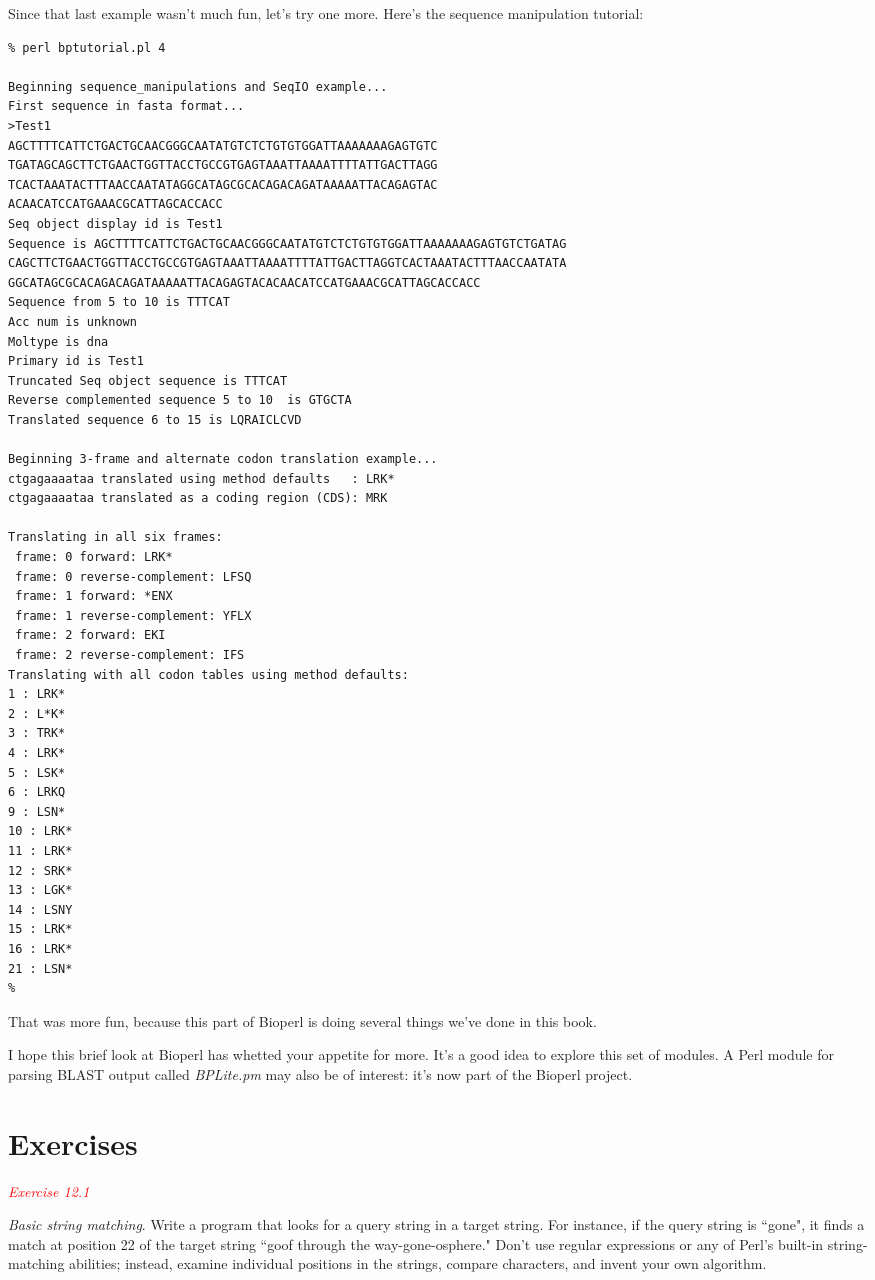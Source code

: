 Since that last example wasn't much fun, let's try one more. Here's the sequence manipulation tutorial: 

\begin{lstlisting}
% perl bptutorial.pl 4

Beginning sequence_manipulations and SeqIO example... 
First sequence in fasta format... 
>Test1
AGCTTTTCATTCTGACTGCAACGGGCAATATGTCTCTGTGTGGATTAAAAAAAGAGTGTC
TGATAGCAGCTTCTGAACTGGTTACCTGCCGTGAGTAAATTAAAATTTTATTGACTTAGG
TCACTAAATACTTTAACCAATATAGGCATAGCGCACAGACAGATAAAAATTACAGAGTAC
ACAACATCCATGAAACGCATTAGCACCACC
Seq object display id is Test1
Sequence is AGCTTTTCATTCTGACTGCAACGGGCAATATGTCTCTGTGTGGATTAAAAAAAGAGTGTCTGATAG
CAGCTTCTGAACTGGTTACCTGCCGTGAGTAAATTAAAATTTTATTGACTTAGGTCACTAAATACTTTAACCAATATA
GGCATAGCGCACAGACAGATAAAAATTACAGAGTACACAACATCCATGAAACGCATTAGCACCACC 
Sequence from 5 to 10 is TTTCAT 
Acc num is unknown 
Moltype is dna 
Primary id is Test1 
Truncated Seq object sequence is TTTCAT 
Reverse complemented sequence 5 to 10  is GTGCTA  
Translated sequence 6 to 15 is LQRAICLCVD 

Beginning 3-frame and alternate codon translation example... 
ctgagaaaataa translated using method defaults   : LRK*
ctgagaaaataa translated as a coding region (CDS): MRK

Translating in all six frames:
 frame: 0 forward: LRK*
 frame: 0 reverse-complement: LFSQ
 frame: 1 forward: *ENX
 frame: 1 reverse-complement: YFLX
 frame: 2 forward: EKI
 frame: 2 reverse-complement: IFS
Translating with all codon tables using method defaults:
1 : LRK*
2 : L*K*
3 : TRK*
4 : LRK*
5 : LSK*
6 : LRKQ
9 : LSN*
10 : LRK*
11 : LRK*
12 : SRK*
13 : LGK*
14 : LSNY
15 : LRK*
16 : LRK*
21 : LSN*
% 
\end{lstlisting}

That was more fun, because this part of Bioperl is doing several things we've done in this book.

I hope this brief look at Bioperl has whetted your appetite for more. It's a good idea to explore this set of modules. A Perl module for parsing BLAST output called \textit{BPLite.pm} may also be of interest: it's now part of the Bioperl project. 

\section{Exercises}
\textcolor{red}{\textit{Exercise 12.1}}
\begin{adjustwidth}{1cm}{}
\textit{Basic string matching}. Write a program that looks for a query string in a target string. For instance, if the query string is ``gone", it finds a match at position 22 of the target string ``goof through the way-gone-osphere." Don't use regular expressions or any of Perl's built-in string-matching abilities; instead, examine individual positions in the strings, compare characters, and invent your own algorithm. 
\end{adjustwidth}

